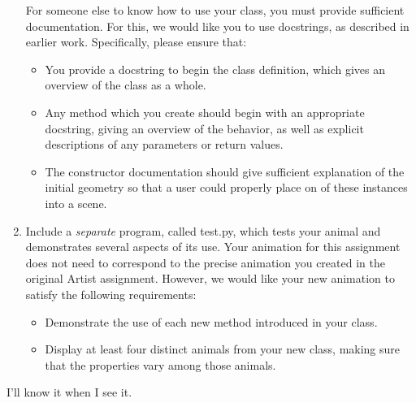 \documentclass[11pt]{article}
\begin{document}
\begin{enumerate}
For someone else to know how to use your class, you must provide
sufficient documentation. For this, we would like you to use
docstrings, as described in earlier work. Specifically, please
ensure that:

\begin{itemize}

\item You provide a docstring to begin the class definition, which
gives an overview of the class as a whole.

\item Any method which you create should begin with an appropriate
docstring, giving an overview of the behavior, as well as explicit
descriptions of any parameters or return values.

\item The constructor documentation should give sufficient explanation
of the initial geometry so that a user could properly place on of
these instances into a scene.

\end{itemize}

\item Include a {\em separate} program, called test.py, which tests your animal and
demonstrates several aspects of its use. Your animation for this
assignment does not need to correspond to the precise animation you
created in the original Artist assignment. However, we would like
your new animation to satisfy the following requirements:

\begin{itemize}
\item Demonstrate the use of each new method introduced in your class.

\item Display at least four distinct animals from your new class,
making sure that the properties vary among those animals.
\end{itemize}

\end{enumerate}

\bigskip

  I'll know it when I see it.
\end{document}
